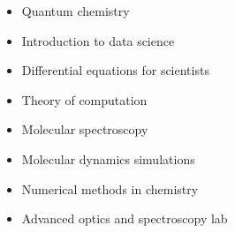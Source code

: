 \vspace*{-0.3 cm}
\begin{multicols}{2}\raggedright %
    \begin{itemize}
        \item[\circ] Quantum chemistry
        \item[\circ] Introduction to data science
        \item[\circ] Differential equations for scientists
        \item[\circ] Theory of computation
      \end{itemize}
  \columnbreak
  
  \begin{itemize}
    \item[\circ] Molecular spectroscopy
    \item[\circ] Molecular dynamics simulations
    \item[\circ] Numerical methods in chemistry 
    \item[\circ] Advanced optics and spectroscopy lab
  \end{itemize}
  \columnbreak
  
\end{multicols}
